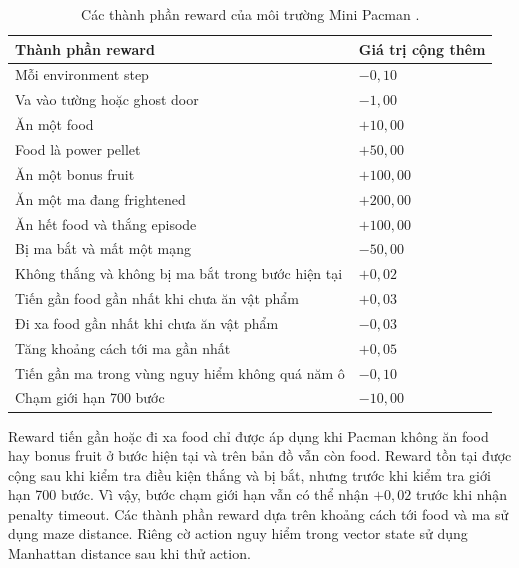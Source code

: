 \begin{table}[H]
    \centering
    \renewcommand{\arraystretch}{1.05}
    \captionsetup{skip=5pt}
    \small
    \begin{tabularx}{0.92\textwidth}{@{}
        >{\raggedright\arraybackslash}X
        >{\centering\arraybackslash}p{2.6cm}
    @{}}
        \toprule
        \textbf{Thành phần reward} & \textbf{Giá trị cộng thêm} \\
        \midrule
        Mỗi environment step & $-0{,}10$ \\
        Va vào tường hoặc ghost door & $-1{,}00$ \\
        Ăn một food & $+10{,}00$ \\
        Food là power pellet & $+50{,}00$ \\
        Ăn một bonus fruit & $+100{,}00$ \\
        Ăn một ma đang frightened & $+200{,}00$ \\
        Ăn hết food và thắng episode & $+100{,}00$ \\
        Bị ma bắt và mất một mạng & $-50{,}00$ \\
        Không thắng và không bị ma bắt trong bước hiện tại & $+0{,}02$ \\
        Tiến gần food gần nhất khi chưa ăn vật phẩm & $+0{,}03$ \\
        Đi xa food gần nhất khi chưa ăn vật phẩm & $-0{,}03$ \\
        Tăng khoảng cách tới ma gần nhất & $+0{,}05$ \\
        Tiến gần ma trong vùng nguy hiểm không quá năm ô & $-0{,}10$ \\
        Chạm giới hạn 700 bước & $-10{,}00$ \\
        \bottomrule
    \end{tabularx}
    \caption{Các thành phần reward của môi trường Mini Pacman \cite{DRLPacmanGitHub}.}
    \label{tab:reward-design}
\end{table}

Reward tiến gần hoặc đi xa food chỉ được áp dụng khi Pacman không ăn food hay bonus fruit ở bước hiện tại và trên bản đồ vẫn còn food. Reward tồn tại được cộng sau khi kiểm tra điều kiện thắng và bị bắt, nhưng trước khi kiểm tra giới hạn 700 bước. Vì vậy, bước chạm giới hạn vẫn có thể nhận $+0{,}02$ trước khi nhận penalty timeout. Các thành phần reward dựa trên khoảng cách tới food và ma sử dụng maze distance. Riêng cờ action nguy hiểm trong vector state sử dụng Manhattan distance sau khi thử action.

